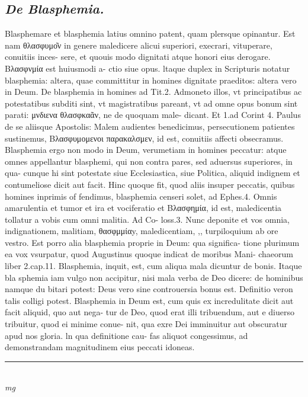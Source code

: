 \documentclass{article}
\begin{document}
\begin{pages}
\subsection*{\textit{De Blasphemia. }}\pstart Blasphemare et blasphemia latius omnino patent, quam plersque  opinantur. Est nam θλασφυμο͂ν in genere maledicere alicui superiori, execrari, vituperare, conuitiis inces- sere, et quouis modo dignitati atque  honori eius derogare. Βλασφνμία est huiusmodi a- ctio siue opus. ltaque  duplex in Scripturis notatur blasphemia: altera, quae committitur in homines dignitate praeditos: altera vero in Deum. De blasphemia in homines ad Tit.2. Admoneto illos, vt principatibus ac potestatibus subditi sint, vt magistratibus pareant, vt ad omne opus bonum sint parati: μνδιενα θλασφκαᾶν, ne de quoquam male- dicant. Et 1.ad Corint 4. Paulus de se aliisque  Apostolis: Malem audientes benedicimus, persecutionem patientes sustinemus, Βλασφυμομενοι παρακαλσμεν, id est, conuitiis affecti obsecramus. Blasphemia ergo non modo in Deum, verumetiam in homines peccatur: atque  omnes appellantur blasphemi, qui non contra pares, sed aduersus superiores, in qua- cunque  hi sint potestate siue Ecclesiastica, siue Politica, aliquid indignem et contumeliose dicit aut facit. Hinc quoque  fit, quod aliis insuper peccatis, quibus homines inprimis of fendimus, blasphemia censeri solet, ad Ephes.4. Omnis amarulentia et tumor et ira et   vociferatio et Βλασφημία, id est, maledicentia tollatur a vobis cum omni malitia. Ad Co-   loss.3. Nunc deponite et vos omnia, indignationem, malitiam, θασφμμίαy, maledicentiam, ,, turpiloquium ab ore vestro. Est porro alia blasphemia proprie in Deum: qua significa- tione plurimum ea vox vsurpatur, quod Augustinus quoque  indicat de moribus Mani- chaeorum liber 2.cap.11. Blasphemia, inquit, est, cum aliqua mala dicuntur de bonis. Itaque  bla   sphemia iam vulgo non accipitur, nisi mala verba de Deo dicere: de hominibus namque  du bitari potest: Deus vero sine controuersia bonus est. Definitio veron talis colligi potest. Blasphemia in Deum est, cum quis ex incredulitate dicit aut facit aliquid, quo aut nega- tur de Deo, quod erat illi tribuendum, aut e diuerso tribuitur, quod ei minime conue-   nit, qua exre Dei imminuitur aut obscuratur apud nos gloria. ln qua definitione cau-   fas aliquot congessimus, ad demonstrandam magnitudinem eius peccati idoneas.  \pend
\vspace{0.5cm}\noindent
\vspace{0.2cm}\rule{1cm}{0.2pt}\\ 
\hspace{0.2cm}\textit{mg}

\end{pages}
\end{document}
